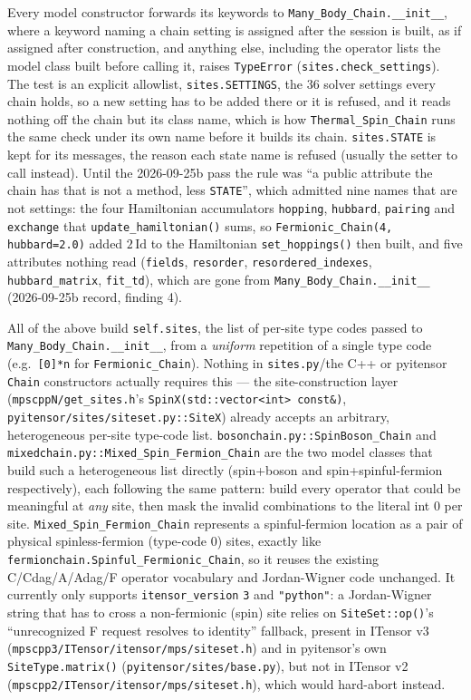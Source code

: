 \documentclass[11pt]{article}
\begin{document}
Every model constructor forwards its keywords to
\texttt{Many\_Body\_Chain.\_\_init\_\_}, where a keyword naming a chain
setting is assigned after the session is built, as if assigned after
construction, and anything else, including the operator lists the model
class built before calling it, raises \texttt{TypeError}
(\texttt{sites.check\_settings}). The test is an explicit allowlist,
\texttt{sites.SETTINGS}, the 36 solver settings every chain holds, so a
new setting has to be added there or it is refused, and it reads nothing
off the chain but its class name, which is how
\texttt{Thermal\_Spin\_Chain} runs the same check under its own name
before it builds its chain. \texttt{sites.STATE} is kept for its messages,
the reason each state name is refused (usually the setter to call
instead). Until the 2026-09-25b pass the rule was ``a public attribute the
chain has that is not a method, less \texttt{STATE}'', which admitted nine
names that are not settings: the four Hamiltonian accumulators
\texttt{hopping}, \texttt{hubbard}, \texttt{pairing} and
\texttt{exchange} that \texttt{update\_hamiltonian()} sums, so
\texttt{Fermionic\_Chain(4, hubbard=2.0)} added $2\,\mathrm{Id}$ to the
Hamiltonian \texttt{set\_hoppings()} then built, and five attributes
nothing read (\texttt{fields}, \texttt{resorder},
\texttt{resordered\_indexes}, \texttt{hubbard\_matrix},
\texttt{fit\_td}), which are gone from
\texttt{Many\_Body\_Chain.\_\_init\_\_} (2026-09-25b record, finding 4).

All of the above build \texttt{self.sites}, the list of per-site type
codes passed to \texttt{Many\_Body\_Chain.\_\_init\_\_}, from a
\emph{uniform} repetition of a single type code (e.g.\ \texttt{[0]*n}
for \texttt{Fermionic\_Chain}). Nothing in \texttt{sites.py}/the C++ or
pyitensor \texttt{Chain} constructors actually requires this --- the
site-construction layer (\texttt{mpscppN/get\_sites.h}'s
\texttt{SpinX(std::vector<int> const\&)},
\texttt{pyitensor/sites/siteset.py::SiteX}) already accepts an
arbitrary, heterogeneous per-site type-code list.
\texttt{bosonchain.py::SpinBoson\_Chain} and
\texttt{mixedchain.py::Mixed\_Spin\_Fermion\_Chain} are the two model
classes that build such a heterogeneous list directly (spin+boson and
spin+spinful-fermion respectively), each following the same pattern:
build every operator that could be meaningful at \emph{any} site, then
mask the invalid combinations to the literal int 0 per site.
\texttt{Mixed\_Spin\_Fermion\_Chain} represents a spinful-fermion
location as a pair of physical spinless-fermion (type-code 0) sites,
exactly like \texttt{fermionchain.Spinful\_Fermionic\_Chain}, so it
reuses the existing C/Cdag/A/Adag/F operator vocabulary and
Jordan-Wigner code unchanged. It currently only supports
\texttt{itensor\_version} \texttt{3} and \texttt{"python"}: a
Jordan-Wigner string that has to cross a non-fermionic (spin) site
relies on \texttt{SiteSet::op()}'s ``unrecognized F request resolves to
identity'' fallback, present in ITensor v3
(\texttt{mpscpp3/ITensor/itensor/mps/siteset.h}) and in pyitensor's own
\texttt{SiteType.matrix()} (\texttt{pyitensor/sites/base.py}), but not
in ITensor v2 (\texttt{mpscpp2/ITensor/itensor/mps/siteset.h}), which
would hard-abort instead.
\end{document}
